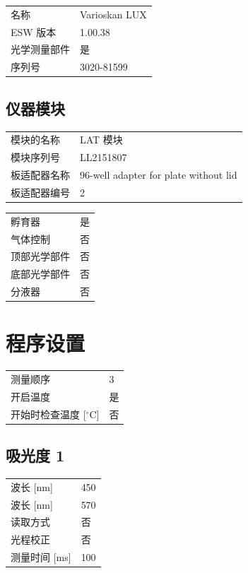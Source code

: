 \documentclass[UTF8,10pt,a4paper,fontset=fandol]{ctexart}
\begin{document}
\begin{tabular}{@{}p{3.2cm}p{10.5cm}@{}}
名称 & Varioskan LUX\\
ESW 版本 & 1.00.38\\
光学测量部件 & 是\\
序列号 & 3020-81599\\
\end{tabular}

\subsection*{仪器模块}

\begin{tabular}{@{}p{4.2cm}p{9.5cm}@{}}
模块的名称 & LAT 模块\\
模块序列号 & LL2151807\\
板适配器名称 & 96-well adapter for plate without lid\\
板适配器编号 & 2\\
\end{tabular}

\begin{tabular}{@{}p{4.2cm}p{9.5cm}@{}}
孵育器 & 是\\
气体控制 & 否\\
顶部光学部件 & 否\\
底部光学部件 & 否\\
分液器 & 否\\
\end{tabular}

\section*{程序设置}

\begin{tabular}{@{}p{5.2cm}p{8.5cm}@{}}
测量顺序 & 3\\
开启温度 & 是\\
开始时检查温度 [$^\circ$C] & 否\\
\end{tabular}

\subsection*{吸光度 1}

\begin{tabular}{@{}p{5.2cm}p{8.5cm}@{}}
波长 [nm] & 450\\
波长 [nm] & 570\\
读取方式 & 否\\
光程校正 & 否\\
测量时间 [ms] & 100\\
\end{tabular}
\end{document}
